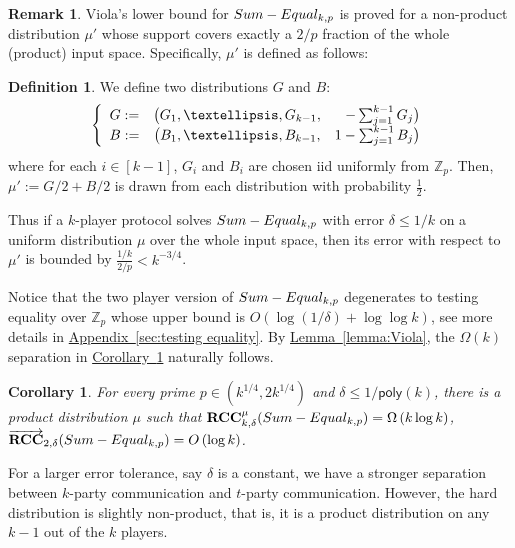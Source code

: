 \documentclass[11pt]{article}
\numberwithin{equation}{section}
\newtheorem{corollary}[theorem]{Corollary}
\theoremstyle{definition}
\newtheorem{definition}[theorem]{Definition}
\newtheorem{remark}[theorem]{Remark}
\theoremstyle{plain}
\newcommand{\Z}{\mathbb Z}
\newcommand{\expref}[2]{\hyperref[#2]{#1~\ref{#2}}}
\newcommand{\poly}{\mathsf{poly}}
\newcommand{\error}{\ensuremath{\delta}}
\newcommand{\bigo}[1]{\ensuremath{{{O} \left( {#1} \right)}}}
\newcommand{\bigomega}[1]{\ensuremath{{\Omega \left( {#1} \right)}}}
\newcommand{\eqdef}{\ensuremath{:=}}
\newcommand{\rcc}{\ensuremath{\mathbf{RCC}}}
\newcommand{\rccone}{\ensuremath{\overrightarrow{\mathbf{RCC}}}}
\newcommand{\sumequal}{\textsc{Sum-Equal} }
\begin{document}
\begin{remark}
\label{remark:Viola}
Viola's lower bound for $\sumequal_{k,p}$ is proved for a non-product distribution $\mu'$ whose support covers exactly a $2/p$ fraction of the whole (product) input  space. Specifically, $\mu'$ is defined as follows:
\begin{definition}
\label{def:Viola_Distribution}
We define two distributions $G$ and $B$:
		\[
			\left\{
			\begin{array}{c c r}
				G \eqdef &	\big( G_1,\dots, G_{k-1} , &-\sum_{j=1}^{k-1} G_j \big)		\\
				B \eqdef &  \big( B_1,\dots, B_{k-1} , &1-\sum_{j=1}^{k-1} B_j \big)
			\end{array}		
			\right.
		\]
%
where for each $i \in [k-1]$, $G_i$ and $B_i$ are chosen iid uniformly from $\Z_p$. Then, $\mu' \eqdef G/2 + B/2$ is drawn from each distribution with probability $\frac{1}{2}$.
\end{definition}
Thus if a $k$-player protocol solves $\sumequal_{k,p}$ with error $\error\le 1/k$ on a uniform distribution $\mu$ over the whole input space,
then its error with respect to $\mu'$ is bounded by $\frac{1/k}{2/p}< k^{-3/4}$.
\end{remark}
Notice that the two player version of $\sumequal_{k,p}$ degenerates to testing equality over $\Z_p$ whose upper bound is $\bigo{\log(1/\error)+\log\log k}$,
see more details in \expref{Appendix}{sec:testing equality}.
By \expref{Lemma}{lemma:Viola}, the $\bigomega{k}$ separation in \expref{Corollary}{corollary:lower bound} naturally follows.

\begin{corollary}\label{corollary:lower bound}
	For every prime $p\in(k^{1/4},2k^{1/4})$ and $\error\le 1/\poly(k)$, there is a product distribution $\mu$ such that $\rcc_{k,\error}^{\mu}(\sumequal_{k,p}) = \bigomega{k\log k}$,
	$\rccone_{2,\error}(\sumequal_{k,p}) = \bigo{\log k}$.
\end{corollary}


For a larger error tolerance, say $\error$ is a constant, we have a stronger separation between $k$-party communication and $t$-party communication. However, the hard distribution is slightly non-product, that is, it is a product distribution on any $k-1$ out of the $k$ players. 
\end{document}
